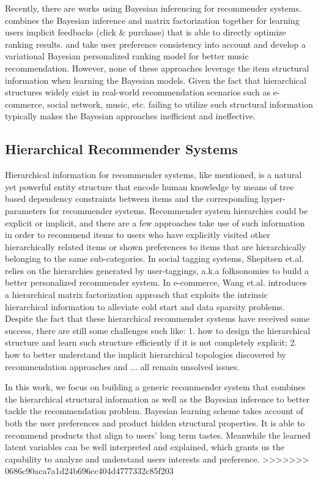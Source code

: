 Recently, there are works using Bayesian inferencing for recommender systems. \cite{rendle2009bpr} combines the Bayesian inference and matrix factorization together for learning users implicit feedbacks (click \& purchase) that is able to directly optimize ranking results. \cite{Ben-Elazar:2017} and \cite{zhang2007efficient} take user preference consistency into account and develop a variational Bayesian personalized ranking model for better music recommendation.  However, none of these approaches leverage the item structural information when learning the Bayesian models.  Given the fact that hierarchical structures widely exist in real-world recommendation scenarios such as e-commerce, social network, music, etc. failing to utilize such structural information typically makes the Bayesian approaches inefficient and ineffective.  

\subsection{Hierarchical Recommender Systems}

Hierarchical information for recommender systems, like mentioned, is a natural yet powerful entity structure that encode human knowledge by means of tree based dependency constraints between items and the corresponding hyper-parameters for recommender systems.  Recommender system hierarchies could be explicit or implicit, and there are a few approaches take use of such information in order to recommend items to users who have explicitly visited other hierarchically related items or shown preferences to items that are hierarchically belonging to the same sub-categories.  In social tagging systems, Shepitsen et.al. \cite{shepitsen2008personalized} relies on the hierarchies generated by user-taggings, a.k.a folksonomies to build a better personalized recommender system.  In e-commerce, Wang et.al. \cite{wang2018exploring} introduces a hierarchical matrix factorization approach that exploits the intrinsic hierarchical information to alleviate cold start and data sparsity problems.  Despite the fact that these hierarchical recommender systems have received some success, there are still some challenges such like: 1. how to design the hierarchical structure and learn such structure efficiently if it is not completely explicit; 2. how to better understand the implicit hierarchical topologies discovered by recommendation approaches and ... all remain unsolved issues.

In this work, we focus on building a generic recommender system that combines the hierarchical structural information as well as the Bayesian inference to better tackle the recommendation problem.  Bayesian learning scheme takes account of both the user preferences and product hidden structural properties. It is able to recommend products that align to users' long term tastes. Meanwhile the learned latent variables can be well interpreted and explained, which grants us the capability to analyze and understand users interests and preference.
>>>>>>> 0686c90aca7a1d24b696cc404d4777332c85f203
